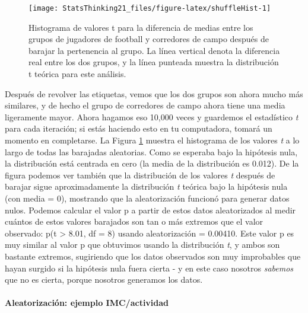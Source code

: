 \documentclass[
  12pt,
]{book}
\begin{document}
\begin{figure}
\texttt{[image: StatsThinking21\_files/figure-latex/shuffleHist-1]} \caption{Histograma de valores t para la diferencia de medias entre los grupos de jugadores de football y corredores de campo después de barajar la pertenencia al grupo. La línea vertical denota la diferencia real entre los dos grupos, y la línea punteada muestra la distribución t teórica para este análisis.}\label{fig:shuffleHist}
\end{figure}

Después de revolver las etiquetas, vemos que los dos grupos son ahora mucho más similares, y de hecho el grupo de corredores de campo ahora tiene una media ligeramente mayor. Ahora hagamos eso 10,000 veces y guardemos el estadístico \emph{t} para cada iteración; si estás haciendo esto en tu computadora, tomará un momento en completarse. La Figura \ref{fig:shuffleHist} muestra el histograma de los valores \emph{t} a lo largo de todas las barajadas aleatorias. Como se esperaba bajo la hipótesis nula, la distribución está centrada en cero (la media de la distribución es 0.012). De la figura podemos ver también que la distribución de los valores \emph{t} después de barajar sigue aproximadamente la distribución \emph{t} teórica bajo la hipótesis nula (con media = 0), mostrando que la aleatorización funcionó para generar datos nulos. Podemos calcular el valor p a partir de estos datos aleatorizados al medir cuántos de estos valores barajados son tan o más extremos que el valor observado: p(t \textgreater{} 8.01, df = 8) usando aleatorización = 0.00410. Este valor p es muy similar al valor p que obtuvimos usando la distribución \emph{t}, y ambos son bastante extremos, sugiriendo que los datos observados son muy improbables que hayan surgido si la hipótesis nula fuera cierta - y en este caso nosotros \emph{sabemos} que no es cierta, porque nosotros generamos los datos.

\hypertarget{aleatorizaciuxf3n-ejemplo-imcactividad}{%
\paragraph{Aleatorización: ejemplo IMC/actividad}\label{aleatorizaciuxf3n-ejemplo-imcactividad}}
\end{document}
